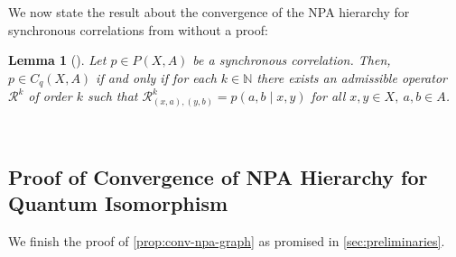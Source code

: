\documentclass[11pt,a4paper]{article}
\theoremstyle{plain}
\newtheorem{lem}[thm]{Lemma}
\theoremstyle{remark}
\theoremstyle{definition}
\begin{document}
We now state the result about the convergence of the NPA hierarchy for synchronous correlations from \cite{russell_synchronous_2023} without a proof: 

\begin{lem}[{\cite[Corollary 2]{russell_synchronous_2023}}]\label{lem:conv-npa-corr}
Let $p \in P(X,A)$ be a synchronous correlation. Then, $p \in C_q(X,A)$ if and only if for each $k \in \mathbb{N}$ there exists an admissible operator $\mathcal{R}^k$ of order $k$ such that $\mathcal{R}^k_{(x,a), (y,b)} = p(a,b\mid x,y)$ for all $x,y \in X, \ a,b \in A$.
\end{lem} \

\subsection{Proof of Convergence of NPA Hierarchy for Quantum Isomorphism}

We finish the proof of \ref{prop:conv-npa-graph} as promised in \cref{sec:preliminaries}. 
\end{document}
